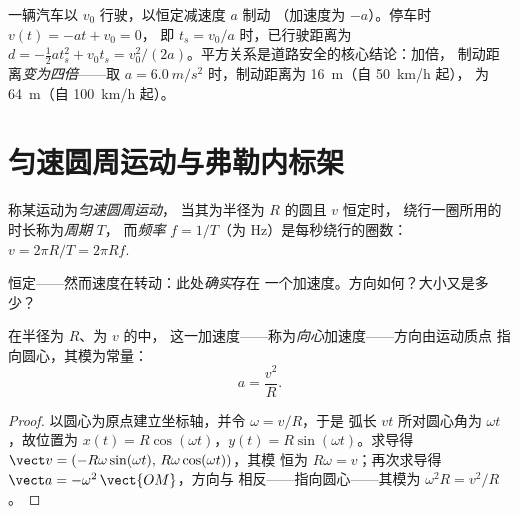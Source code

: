 \begin{example}[制动距离]\label{ex:g12:kinematics-2d:braking}
一辆汽车以 $v_0$ 行驶，以恒定减速度 $a$ 制动
（加速度为 $-a$）。停车时 $v(t) = -a t + v_0 = 0$，
即 $t_s = v_0/a$ 时，已行驶距离为 $d = -\tfrac12 a t_s^2 + v_0 t_s =
v_0^2/(2a)$。平方关系是道路安全的核心结论：加倍，
制动距离\emph{变为四倍}——取 $a =
\qty{6.0}{m/s^2}$ 时，制动距离为 \qty{16}{m}（自 \qty{50}{km/h} 起），
为 \qty{64}{m}（自 \qty{100}{km/h} 起）。
\end{example}

\section{匀速圆周运动与弗勒内标架}

\begin{definition}[匀速圆周运动]\label{def:g12:kinematics-2d:ucm}
称某运动为\emph{匀速圆周运动}，
当其为半径为 $R$ 的圆且 $v$ 恒定时，
绕行一圈所用的时长称为\emph{周期} $T$，
而\emph{频率}
 $f = 1/T$（为 \unit{Hz}）是每秒绕行的圈数：
$v = 2\pi R/T = 2\pi R f$.
\end{definition}

恒定——然而速度在转动：此处\emph{确实}存在
一个加速度。方向如何？大小又是多少？

\begin{theorem}[向心加速度]\label{thm:g12:kinematics-2d:centripetal}
%
在半径为 $R$、为 $v$ 的中，
这一加速度——称为\emph{向心}加速度——方向由运动质点
指向圆心，其模为常量：
\[
a = \frac{v^2}{R}.
\]
\end{theorem}

\begin{proof}
以圆心为原点建立坐标轴，并令 $\omega = v/R$，于是
弧长 $v t$ 所对圆心角为 $\omega t$，故位置为
$x(t) = R\cos(\omega t)$，$y(t) = R\sin(\omega t)$。求导得
$\vect v = (-R\omega\sin(\omega t),\, R\omega\cos(\omega t))$，其模
恒为 $R\omega = v$；再次求导得
$\vect a = -\omega^2\,\vect{OM}$，方向与
相反——指向圆心——其模为 $\omega^2 R = v^2/R$。
\end{proof}

